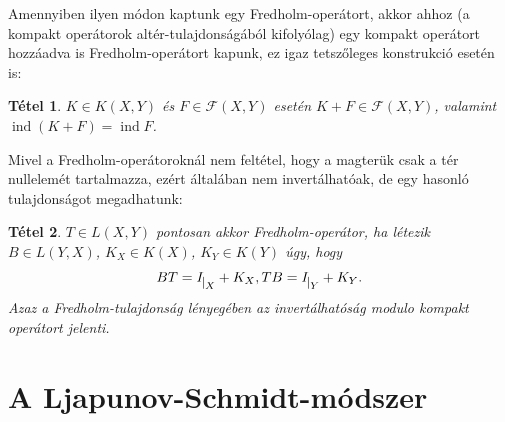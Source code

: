 \documentclass[oneside, titlepage, 12pt, a4paper]{report}
\newtheorem{theorem}{Tétel}[section]
\DeclareMathOperator{\ind}{ind}	%
\begin{document}
Amennyiben ilyen módon kaptunk egy Fredholm-operátort, akkor ahhoz (a kompakt operátorok altér-tulajdonságából kifolyólag) egy kompakt operátort hozzáadva is Fredholm-operátort kapunk, ez igaz tetszőleges konstrukció esetén is:
\begin{theorem}
$K \in K(X, Y)$ és $F \in \mathcal{F}(X, Y)$ esetén $K + F \in \mathcal{F}(X, Y)$, valamint $\ind(K + F) = \ind F$. \cite{FcNotex}
\end{theorem}

Mivel a Fredholm-operátoroknál nem feltétel, hogy a magterük csak a tér nullelemét tartalmazza, ezért általában nem invertálhatóak, de egy hasonló tulajdonságot megadhatunk:	%
\begin{theorem}
$T \in L(X, Y)$ pontosan akkor Fredholm-operátor, ha létezik $B \in L(Y, X)$, $K_X \in K(X)$, $K_Y \in K(Y)$ úgy, hogy
\begin{equation*}
BT = I_{\mkern 1mu \vrule height 2ex\mkern2mu X} + K_X, TB = I_{\mkern 1mu \vrule height 2ex\mkern2mu Y} + K_Y.
\end{equation*}
Azaz a Fredholm-tulajdonság lényegében az invertálhatóság modulo kompakt operátort jelenti. \cite{FcNotex, diffun2}
\end{theorem}


\onehalfspacing
\chapter{A Ljapunov-Schmidt-módszer}
\label{chap:modszer}


 

 
\end{document}
